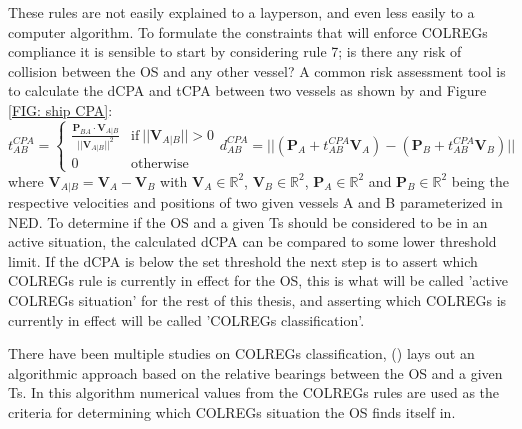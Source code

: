 These rules are not easily explained to a layperson, and even less easily to a computer algorithm. To formulate the constraints that will
enforce \gls{COLREGs} compliance it is sensible to start by considering rule 7; is there any risk of collision between the \gls{OS}
and any other vessel? A common risk assessment tool is to calculate the \gls{dCPA} and \gls{tCPA} between two vessels as shown by \cite{Kufoalor2018} and Figure \ref{FIG: ship CPA}:
\begin{subequations}    \label{eq:tCPAdCPA}
    \begin{equation}
        t_{AB}^{CPA} = 
        \begin{cases}
          \frac{\textbf{P}_{BA} \cdot \textbf{V}_{A|B}}{||\textbf{V}_{A|B}||^2} & \text{if}\ ||\textbf{V}_{A|B}|| > 0 \\
          0 & \text{otherwise}
        \end{cases}
    \end{equation}
    \begin{equation}
        d_{AB}^{CPA} = ||(\textbf{P}_A + t_{AB}^{CPA} \textbf{V}_A) - (\textbf{P}_B + t_{AB}^{CPA} \textbf{V}_B)||
    \end{equation}
\end{subequations}
where $\textbf{V}_{A|B} = \textbf{V}_A - \textbf{V}_B$ with $\textbf{V}_A \in \mathbb{R}^2$, $\textbf{V}_B \in \mathbb{R}^2$, 
$\textbf{P}_A \in \mathbb{R}^2$ and $\textbf{P}_B \in \mathbb{R}^2$ being the respective
velocities and positions of two given vessels A and B parameterized in NED. To determine if the \gls{OS} and a given \gls{Ts} should be
considered to be in an active situation, the calculated \gls{dCPA} can be compared to some lower threshold limit. If the \gls{dCPA} is below the set threshold
the next step is to assert which \gls{COLREGs} rule is currently in effect for the \gls{OS}, this is what will be called 'active \gls{COLREGs}
situation' for the rest of this thesis, and asserting which \gls{COLREGs} is currently in effect will be called 'COLREGs classification'.

There have been multiple studies on \gls{COLREGs} classification, (\cite{woerner2016multi}) lays out an algorithmic approach based on the
relative bearings between the \gls{OS} and a given \gls{Ts}. In this algorithm numerical values from the \gls{COLREGs} rules are used 
as the criteria for determining which \gls{COLREGs} situation the \gls{OS} finds itself in. 


